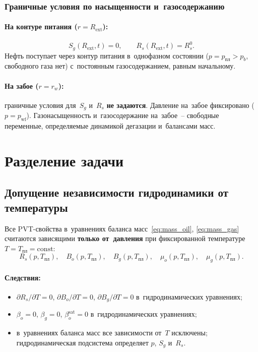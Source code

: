 \documentclass[12pt,a4paper]{article}
\newcommand{\rw}{r_w}
\newcommand{\Rext}{R_{\mathrm{ext}}}
\newcommand{\ppl}{p_{\text{пл}}}
\newcommand{\pwf}{p_{\mathrm{wf}}}
\newcommand{\pb}{p_b}
\newcommand{\Tpl}{T_{\text{пл}}}
\newcommand{\bsat}{\beta_o^{\mathrm{sat}}}
\begin{document}
\subsubsection{Граничные условия по насыщенности и~газосодержанию}
\label{sssec:bc_Sg}

\paragraph{На контуре питания ($r = \Rext$):}
\begin{equation}\label{eq:bc_Sg_ext}
  S_g(\Rext, t) = 0, \qquad R_s(\Rext, t) = R_s^0.
\end{equation}
Нефть поступает через контур питания в~однофазном состоянии
($p = \ppl > \pb$, свободного газа нет) с~постоянным
газосодержанием, равным начальному.

\paragraph{На забое ($r = \rw$):}
граничные условия для~$S_g$ и~$R_s$ \textbf{не задаются}. Давление
на~забое фиксировано ($p = \pwf$). Газонасыщенность и~газосодержание
на~забое~-- свободные переменные, определяемые динамикой дегазации
и~балансами масс.


\section{Разделение задачи}\label{sec:splitting}

\subsection{Допущение независимости гидродинамики от температуры}
\label{ssec:T_independent}

Все PVT-свойства в~уравнениях баланса масс~\eqref{eq:mass_oil},
\eqref{eq:mass_gas} считаются зависящими
\textbf{только от~давления} при фиксированной температуре
$T = \Tpl = \mathrm{const}$:
\[
  R_s(p, \Tpl), \quad B_o(p, \Tpl), \quad B_g(p, \Tpl), \quad
  \mu_o(p, \Tpl), \quad \mu_g(p, \Tpl).
\]

\paragraph{Следствия:}
\begin{itemize}[nosep]
  \item $\partial R_s/\partial T = 0$, $\partial B_o/\partial T = 0$,
        $\partial B_g/\partial T = 0$ в~гидродинамических уравнениях;
  \item $\beta_o = 0$, $\beta_g = 0$, $\bsat = 0$
        в~гидродинамических уравнениях;
  \item в~уравнениях баланса масс все зависимости от~$T$ исключены;
        гидродинамическая подсистема определяет $p$, $S_g$ и~$R_s$.
\end{itemize}
\end{document}
